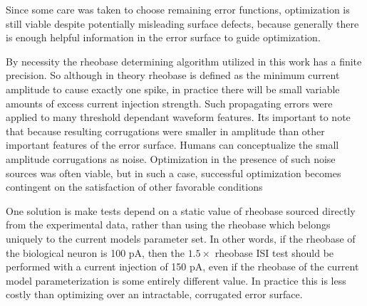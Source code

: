 

Since some care was taken to choose remaining error functions, optimization is still viable despite potentially misleading surface defects, because generally there is enough helpful information in the error surface to guide optimization.%

By necessity the rheobase determining algorithm utilized in this work has a finite precision. So although in theory rheobase is defined as the minimum current amplitude to cause exactly one spike, in practice there will be small variable amounts of excess current injection strength. Such propagating errors were applied to many threshold dependant waveform features. Its important to note that because resulting corrugations were smaller in amplitude than other important features of the error surface. Humans can conceptualize the small amplitude corrugations as noise. Optimization in the presence of such noise sources was often viable, but in such a case, successful optimization becomes contingent on the satisfaction of other favorable conditions





One solution is make tests depend on a static value of rheobase sourced directly from the experimental data, rather than using the rheobase which belongs uniquely to the current models parameter set.
In other words, if the rheobase of the biological neuron is 100 pA, then the $1.5\times$ rheobase ISI test should be performed with a current injection of 150 pA, even if the rheobase of the current model parameterization is some entirely different value.
In practice this is less costly than optimizing over an intractable, corrugated error surface.


